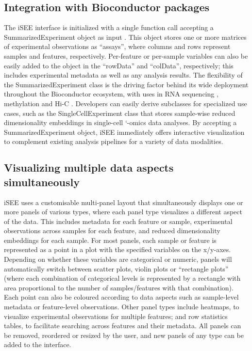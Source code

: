\documentclass{bioinfo}
\begin{document}
\subsection{Integration with Bioconductor packages} 
The iSEE interface is initialized with a single function call accepting a SummarizedExperiment object as input \citep{huber2015orchestrating}.
This object stores one or more matrices of experimental observations as ``assays'', where columns and rows represent samples and features, respectively. 
Per-feature or per-sample variables can also be easily added to the object in the ``rowData'' and ``colData'', respectively; this includes experimental metadata as well as any analysis results. 
The flexibility of the SummarizedExperiment class is the driving factor behind its wide deployment throughout the Bioconductor ecosystem, with uses in RNA sequencing \citep{love2014moderated}, methylation \citep{aryee2014minfi} and Hi-C \citep{lun2016infrastructure}.
Developers can easily derive subclasses for specialized use cases, such as the SingleCellExperiment class that stores sample-wise reduced dimensionality embeddings in single-cell `-omics data analyses. 
By accepting a SummarizedExperiment object, iSEE immediately offers interactive visualization to complement existing analysis pipelines for a variety of data modalities. 

\subsection{Visualizing multiple data aspects simultaneously}
iSEE uses a customisable multi-panel layout that simultaneously displays one or more panels of various types, where each panel type visualizes a different aspect of the data. 
This includes metadata for each feature or sample, experimental observations across samples for each feature, and reduced dimensionality embeddings for each sample. 
For most panels, each sample or feature is represented as a point in a plot with the specified variables on the x/y-axes.
Depending on whether these variables are categorical or numeric, panels will automatically switch between scatter plots, violin plots or ``rectangle plots'' (where each combination of categorical levels is represented by a rectangle with area proportional to the number of samples/features with that combination). 
Each point can also be coloured according to data aspects such as sample-level metadata or feature-level observations. 
Other panel types include heatmaps, to visualize experimental observations for multiple features; and row statistics tables, to facilitate searching across features and their metadata.
All panels can be removed, reordered or resized by the user, and new panels of any type can be added to the interface.
\end{document}
